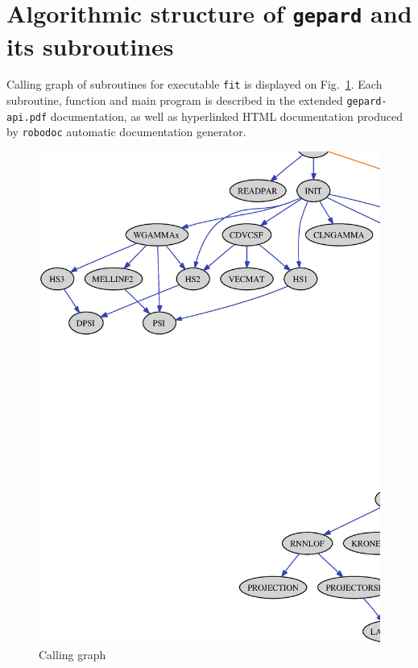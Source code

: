 \documentclass[12pt]{article}
\begin{document}
\section{Algorithmic structure of \texttt{gepard} and its subroutines}

Calling graph of subroutines for executable \texttt{fit} is displayed on
Fig.~\ref{fig:callgraph}. Each subroutine,
function and main program is described in the extended \texttt{gepard-api.pdf} documentation,
as well as hyperlinked HTML documentation produced by \texttt{robodoc} automatic
documentation generator.

\begin{figure}[ht]
\begin{center}
\includegraphics[scale=0.52]{callgraph}
\end{center}
\caption{Calling graph}
\label{fig:callgraph}
\end{figure}




%

%

\end{document}
